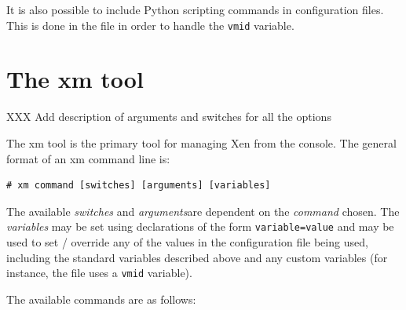 \documentclass[11pt,twoside,final,openright]{xenstyle}
\begin{document}
It is also possible to include Python scripting commands in
configuration files.  This is done in the  file in
order to handle the {\tt vmid} variable.

\chapter{The xm tool}
\label{cha:xm}

XXX Add description of arguments and switches for all the options

The xm tool is the primary tool for managing Xen from the console.
The general format of an xm command line is:

\begin{verbatim}
# xm command [switches] [arguments] [variables]
\end{verbatim}

The available {\em switches } and {\em arguments}are dependent on the
{\em command} chosen.  The {\em variables} may be set using
declarations of the form {\tt variable=value} and may be used to set /
override any of the values in the configuration file being used,
including the standard variables described above and any custom
variables (for instance, the  file uses a {\tt vmid}
variable).

The available commands are as follows:
\end{document}
